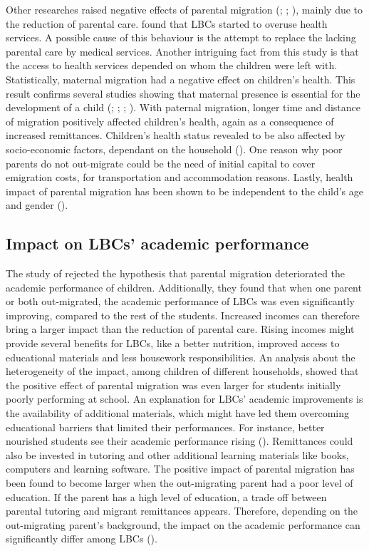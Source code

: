 Other researches raised negative effects of parental migration (\cite{amato1999nonresident}; \cite{kanaiaupuni2000reframing}; \cite{fernandez1998fathers}), mainly due to the reduction of parental care. \textcite{song2009health} found that LBCs started to overuse health services. A possible cause of this behaviour is the attempt to replace the lacking parental care by medical services. Another intriguing fact from this study is that the access to health services depended on whom the children were left with. Statistically, maternal migration had a negative effect on children's health. This result confirms several studies showing that maternal presence is essential for the development of a child (\cite{cortes2015feminization}; \cite{jampaklay2006parental}; \cite{macours2010seasonal}; \cite{thomas1994like}). With paternal migration, longer time and distance of migration positively affected children's health, again as a consequence of increased remittances. Children's health status revealed to be also affected by socio-economic factors, dependant on the household (\cite{behrman1996impact}). One reason why poor parents do not out-migrate could be the need of initial capital to cover emigration costs, for transportation and accommodation reasons. Lastly, health impact of parental migration has been shown to be independent to the child's age and gender (\cite{guo2017effect}). 

\subsection{Impact on LBCs' academic performance}
\label{subsec:impact_academic_performance}

The study of \textcite{bai2017effect} rejected the hypothesis that parental migration deteriorated the academic performance of children. Additionally, they found that when one parent or both out-migrated, the academic performance of LBCs was even significantly improving, compared to the rest of the students. Increased incomes can therefore bring a larger impact than the reduction of parental care. Rising incomes might provide several benefits for LBCs, like a better nutrition, improved access to educational materials and less housework responsibilities. An analysis about the heterogeneity of the impact, among children of different households, showed that the positive effect of parental migration was even larger for students initially poorly performing at school. An explanation for LBCs' academic improvements is the availability of additional materials, which might have led them overcoming educational barriers that limited their performances. For instance, better nourished students see their academic performance rising (\cite{luo2012nutrition}). Remittances could also be invested in tutoring and other additional learning materials like books, computers and learning software. The positive impact of parental migration has been found to become larger when the out-migrating parent had a poor level of education. If the parent has a high level of education, a trade off between parental tutoring and migrant remittances appears. Therefore, depending on the out-migrating parent's background, the impact on the academic performance can significantly differ among LBCs (\cite{sawyer2016money}). 

